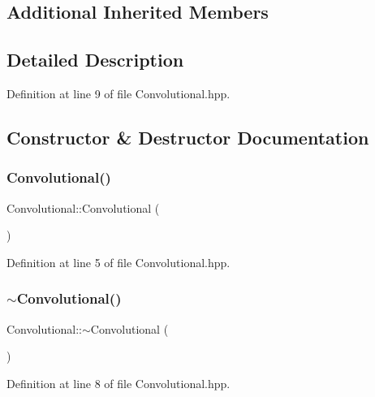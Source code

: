 \subsection*{Additional Inherited Members}


\subsection{Detailed Description}


Definition at line 9 of file Convolutional.\+hpp.



\subsection{Constructor \& Destructor Documentation}
\mbox{\label{class_convolutional_adda39e974f455ea0fd2758b6b020aabc}} 
\subsubsection{\texorpdfstring{Convolutional()}{Convolutional()}}
{\footnotesize\ttfamily Convolutional\+::\+Convolutional (\begin{DoxyParamCaption}{ }\end{DoxyParamCaption})}



Definition at line 5 of file Convolutional.\+hpp.

\mbox{\label{class_convolutional_a106274399705e27f3afb1a896907d2bf}} 
\subsubsection{\texorpdfstring{$\sim$\+Convolutional()}{~Convolutional()}}
{\footnotesize\ttfamily Convolutional\+::$\sim$\+Convolutional (\begin{DoxyParamCaption}{ }\end{DoxyParamCaption})}



Definition at line 8 of file Convolutional.\+hpp.



